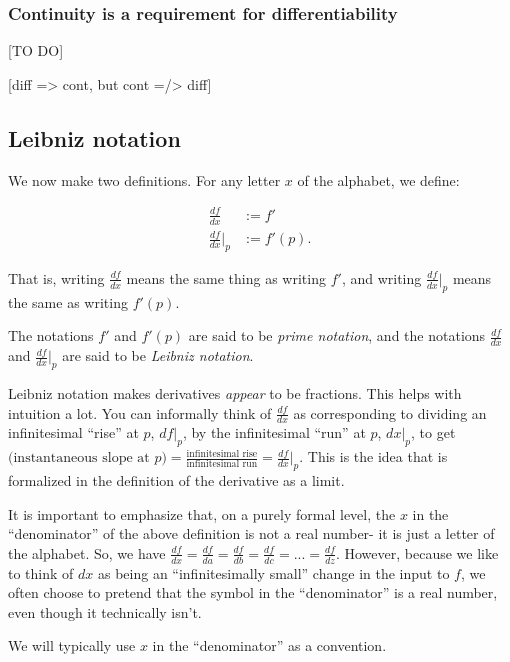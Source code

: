 \documentclass{article}
\begin{document}
\subsubsection*{Continuity is a requirement for differentiability}

[TO DO]

[diff => cont, but cont =/> diff]

\subsection*{Leibniz notation}
     
We now make two definitions. For any letter $x$ of the alphabet, we define:

\begin{align*}
    \frac{df}{dx} &:= f' \\
    \frac{df}{dx}\Big|_p &:= f'(p).
\end{align*}

That is, writing $\frac{df}{dx}$ means the same thing as writing $f'$, and writing $\frac{df}{dx}\Big|_p$ means the same as writing $f'(p)$.

The notations $f'$ and $f'(p)$ are said to be \textit{prime notation}, and the notations $\frac{df}{dx}$ and $\frac{df}{dx}\Big|_p$ are said to be \textit{Leibniz notation}.

Leibniz notation makes derivatives \textit{appear} to be fractions. This helps with intuition a lot. You can informally think of $\frac{df}{dx}$ as corresponding to dividing an infinitesimal ``rise'' at $p$, $df|_p$, by the infinitesimal ``run'' at $p$, $dx|_p$, to get $(\text{instantaneous slope at $p$)} = \frac{\text{infinitesimal rise}}{\text{infinitesimal run}} = \frac{df}{dx}\Big|_p$. This is the idea that is formalized in the definition of the derivative as a limit.

It is important to emphasize that, on a purely formal level, the $x$ in the ``denominator'' of the above definition is not a real number- it is just a letter of the alphabet. So, we have $\frac{df}{dx} = \frac{df}{da} = \frac{df}{db} = \frac{df}{dc} = ... = \frac{df}{dz}$. However, because we like to think of $dx$ as being an ``infinitesimally small'' change in the input to $f$, we often choose to pretend that the symbol in the ``denominator'' is a real number, even though it technically isn't. 

We will typically use $x$ in the ``denominator'' as a convention.

\vspace{.5cm}
\end{document}
